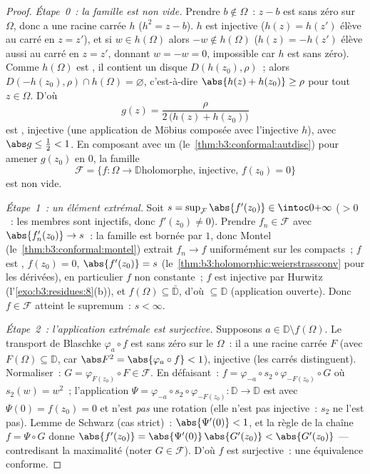 \begin{proof}
\emph{Étape~0~: la famille est non vide.} Prendre $b \notin
\Omega$~: $z - b$ est sans zéro sur $\Omega$, donc a une
racine carrée  $h$ ($h^2 = z - b$). $h$ est
injective ($h(z) = h(z')$ élève au carré en $z = z'$), et si
$w \in h(\Omega)$ alors $-w \notin h(\Omega)$ ($h(z) =
-h(z')$ élève aussi au carré en $z = z'$, donnant $w = -w =
0$, impossible car $h$ est sans zéro). Comme $h(\Omega)$ est
, il contient un disque $D(h(z_0), \rho)$~; alors
$D(-h(z_0), \rho) \cap h(\Omega) = \varnothing$,
c'est-à-dire $\abs{h(z) + h(z_0)} \geq \rho$ pour tout $z
\in \Omega$. D'où
\[
g(z) = \frac{\rho}{2\,\bigl(h(z) + h(z_0)\bigr)}
\]
est , injective (une application de Möbius composée
avec l'injective $h$), avec $\abs g \leq \frac12 < 1$. En
composant avec un 
(le~\cref{thm:b3:conformal:autdisc}) pour amener $g(z_0)$ en
$0$, la famille
\[
\mathcal F = \{f \colon \Omega \to \mathbb D \text{
holomorphe, injective, } f(z_0) = 0\}
\]
est non vide.

\emph{Étape~1~: un élément extrémal.} Soit $s =
\sup_{\mathcal F}\abs{f'(z_0)} \in \intoc0{+\infty}$ ($> 0$~:
les membres sont injectifs, donc $f'(z_0) \neq 0$). Prendre
$f_n \in \mathcal F$ avec $\abs{f_n'(z_0)} \to s$~: la
famille est bornée par $1$, donc Montel
(le~\cref{thm:b3:conformal:montel}) extrait $f_n \to f$
uniformément sur les compacts~; $f$ est , $f(z_0)
= 0$, $\abs{f'(z_0)} = s$
(le~\cref{thm:b3:holomorphic:weierstrassconv} pour les
dérivées), en particulier $f$ non constante~; $f$ est
injective par Hurwitz (l'\cref{exo:b3:residues:8}(b)), et
$f(\Omega) \subseteq \bar{\mathbb D}$, d'où $\subseteq
\mathbb D$ (application ouverte). Donc $f \in \mathcal F$
atteint le supremum~: $s < \infty$.

\emph{Étape~2~: l'application extrémale est surjective.}
Supposons $a \in \mathbb D\setminus f(\Omega)$. Le transport
de Blaschke $\varphi_a\circ f$ est sans zéro sur le
 $\Omega$~: il a une racine carrée
 $F$ (avec $F(\Omega) \subseteq \mathbb D$, car
$\abs F^2 = \abs{\varphi_a\circ f} < 1$), injective (les
carrés distinguent). Normaliser~: $G =
\varphi_{F(z_0)}\circ F \in \mathcal F$. En défaisant~: $f
= \varphi_{-a}\circ s_2 \circ \varphi_{-F(z_0)}\circ G$ où
$s_2(w) = w^2$~; l'application $\Psi =
\varphi_{-a}\circ s_2\circ\varphi_{-F(z_0)} \colon \mathbb D
\to \mathbb D$ est  avec $\Psi(0) = f(z_0) = 0$ et
n'est \emph{pas} une rotation (elle n'est pas injective~:
$s_2$ ne l'est pas). Lemme de Schwarz (cas strict)~:
$\abs{\Psi'(0)} < 1$, et la règle de la chaîne $f = \Psi\circ
G$ donne $\abs{f'(z_0)} = \abs{\Psi'(0)}\,\abs{G'(z_0)} <
\abs{G'(z_0)}$ --- contredisant la maximalité (noter $G \in
\mathcal F$). D'où $f$ est surjective~: une équivalence
conforme.


\end{proof}
